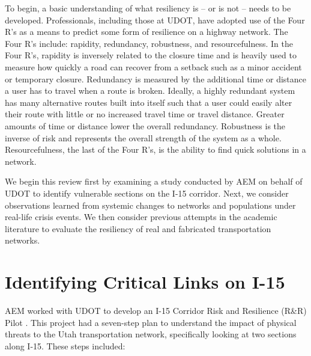 To begin, a basic understanding of what resiliency is -- or is not -- needs
to be developed. Professionals, including those at UDOT, have adopted use of
the Four R’s as a means to predict some form of resilience on a highway
network. The Four R’s include: rapidity, redundancy, robustness, and
resourcefulness. In the Four R's, rapidity is inversely related to the closure
time and is heavily used to measure how quickly a road can recover from a
setback such as a minor accident or temporary closure. Redundancy is measured
by the additional time or distance a user has to travel when a route is broken.
Ideally, a highly redundant system has many alternative routes built into
itself such that a user could easily alter their route with little or no
increased travel time or travel distance. Greater amounts of time or distance
lower the overall redundancy. Robustness is the inverse of risk and represents
the overall strength of the system as a whole. Resourcefulness, the last of the
Four R’s, is the ability to find quick solutions in a network.

We begin this review first by examining a study conducted by AEM on
behalf of UDOT to identify
vulnerable sections on the I-15 corridor. Next, we consider observations
learned from systemic
changes to networks and populations under real-life crisis events. We then
consider previous
attempts in the academic literature to evaluate the resiliency of real and fabricated
transportation networks.

\section{Identifying Critical Links on I-15}

AEM worked with UDOT to develop an I-15 Corridor Risk and Resilience
(R\&R) Pilot \citep{aem2017}.
This
project had a seven-step plan to understand the impact of physical threats
to the Utah
transportation network, specifically looking at two sections along I-15.
These steps included:

